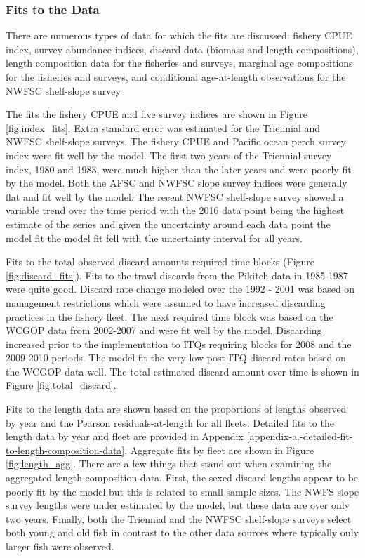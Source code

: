 \documentclass[12pt,]{article}
\begin{document}
\subsubsection{Fits to the Data}\label{fits-to-the-data}

There are numerous types of data for which the fits are discussed:
fishery CPUE index, survey abundance indices, discard data (biomass and
length compositions), length composition data for the fisheries and
surveys, marginal age compositions for the fisheries and surveys, and
conditional age-at-length observations for the NWFSC shelf-slope survey

The fits the fishery CPUE and five survey indices are shown in Figure
\ref{fig:index_fits}. Extra standard error was estimated for the
Triennial and NWFSC shelf-slope surveys. The fishery CPUE and Pacific
ocean perch survey index were fit well by the model. The first two years
of the Triennial survey index, 1980 and 1983, were much higher than the
later years and were poorly fit by the model. Both the AFSC and NWFSC
slope survey indices were generally flat and fit well by the model. The
recent NWFSC shelf-slope survey showed a variable trend over the time
period with the 2016 data point being the highest estimate of the series
and given the uncertainty around each data point the model fit the model
fit fell with the uncertainty interval for all years.

Fits to the total observed discard amounts required time blocks (Figure
\ref{fig:discard_fits}). Fits to the trawl discards from the Pikitch
data in 1985-1987 were quite good. Discard rate change modeled over the
1992 - 2001 was based on management restrictions which were assumed to
have increased discarding practices in the fishery fleet. The next
required time block was based on the WCGOP data from 2002-2007 and were
fit well by the model. Discarding increased prior to the implementation
to ITQs requiring blocks for 2008 and the 2009-2010 periods. The model
fit the very low post-ITQ discard rates based on the WCGOP data well.
The total estimated discard amount over time is shown in Figure
\ref{fig:total_discard}.

Fits to the length data are shown based on the proportions of lengths
observed by year and the Pearson residuals-at-length for all fleets.
Detailed fits to the length data by year and fleet are provided in
Appendix \ref{appendix-a.-detailed-fit-to-length-composition-data}.
Aggregate fits by fleet are shown in Figure \ref{fig:length_agg}. There
are a few things that stand out when examining the aggregated length
composition data. First, the sexed discard lengths appear to be poorly
fit by the model but this is related to small sample sizes. The NWFS
slope survey lengths were under estimated by the model, but these data
are over only two years. Finally, both the Triennial and the NWFSC
shelf-slope surveys select both young and old fish in contrast to the
other data sources where typically only larger fish were observed.
\end{document}
